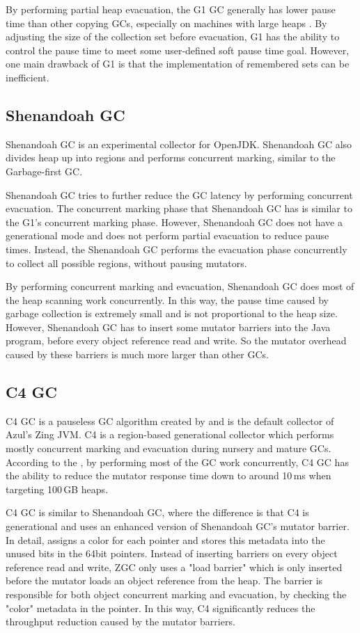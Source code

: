 By performing partial heap evacuation, the G1 GC generally has lower pause time
than other copying GCs, especially on machines with large heaps \citep{detlefs2004garbage}.
By adjusting the size of the collection set before evacuation, G1 has the ability
to control the pause time to meet some user-defined soft pause time goal.
However, one main drawback of G1 is that the implementation of remembered sets can be inefficient.

\subsection{Shenandoah GC}

Shenandoah GC is an experimental collector for OpenJDK.
Shenandoah GC also divides heap up into regions and performs concurrent marking,
similar to the Garbage-first GC.

Shenandoah GC tries to further reduce the GC latency by performing concurrent
evacuation. The concurrent marking phase that Shenandoah GC has is similar to
the G1's concurrent marking phase. However, Shenandoah GC does not have a generational
mode and does not perform partial evacuation to reduce pause times.
Instead, the Shenandoah GC performs the evacuation phase concurrently to collect
all possible regions, without pausing mutators.

By performing concurrent marking and evacuation, Shenandoah GC does most of the
heap scanning work concurrently. In this way, the pause time caused by garbage collection
is extremely small and is not proportional to the heap size.
However, Shenandoah GC has to insert some mutator barriers into the Java program,
before every object reference read and write. So the mutator overhead caused by
these barriers is much more larger than other GCs.

\subsection{C4 GC}

C4 GC is a pauseless GC algorithm created by \cite{tene2011c4} and is the default
collector of Azul's Zing JVM. C4 is a region-based generational collector which
performs mostly concurrent marking and evacuation during nursery and mature GCs.
According to the \cite{tene2011c4},
by performing most of the GC work concurrently, C4 GC has the ability to reduce the
mutator response time down to around 10\,ms when targeting 100\,GB heaps.

C4 GC is similar to Shenandoah GC, where the difference is that C4 is generational
and uses an enhanced version of Shenandoah GC's mutator barrier.
In detail, assigns a color for each pointer and stores this metadata into the
unused bits in the 64bit pointers.
Instead of inserting barriers on every object reference read and write,
ZGC only uses a "load barrier" which is only inserted before the mutator loads an
object reference from the heap. The barrier is responsible for both object concurrent marking
and evacuation, by checking the "color" metadata in the pointer.
In this way, C4 significantly reduces the throughput reduction caused by the mutator
barriers.

